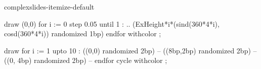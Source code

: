 \startmodule complexslides-itemize-default

  draw (0,0) 
    for i := 0 step 0.05 until 1 :
      .. (ExHeight*i*(sind(360*4*i), cosd(360*4*i)) randomized 1bp)
    endfor
      withcolor  ;
\stopuseMPgraphic

  draw
  for i := 1 upto 10 :
    ((0,0) randomized 2bp) --
    ((8bp,2bp) randomized 2bp) --
    ((0, 4bp) randomized 2bp) --
  endfor cycle withcolor  ;
\stopuseMPgraphic

\setupitemize[color=foreground:1,
              headstyle=\tfa,
              headcolor=foreground:1]

\setupitemize[autointro]

\setupitemize[2][headstyle=bold,headcolor=]


\setupitemize[itemalign=flushright,distance=0.5em]

\stopmodule

